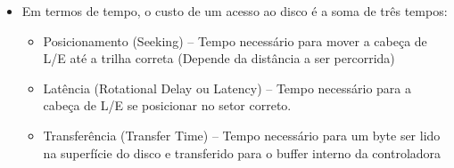 \documentclass[12pt]{article}
\begin{document}
\begin{itemize}
\begin{itemize}
            \item Em termos de tempo, o custo de um acesso ao disco é a soma 
            de três tempos:
            \begin{itemize}
                \item Posicionamento (Seeking) -- Tempo necessário para mover a 
                cabeça de L/E até a trilha correta (Depende da distância a ser 
                percorrida)
                \item Latência (Rotational Delay ou Latency) -- Tempo necessário 
                para a cabeça de L/E se posicionar no setor correto.
                \item Transferência (Transfer Time) -- Tempo necessário para um 
                byte ser lido na superfície do disco e transferido para o buffer 
                interno da controladora
            \end{itemize}
        \end{itemize}
    \end{itemize}
\end{document}

